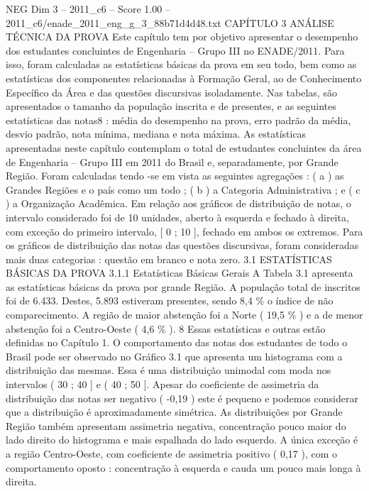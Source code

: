\begin{textsample}{NEG Dim 3 – 2011\_c6 – Score 1.00 – 2011\_c6/enade\_2011\_eng\_g\_3\_88b71d4d48.txt}  \label{ex:f3_neg_080}
CAPÍTULO 3 ANÁLISE TÉCNICA DA PROVA Este capítulo tem por objetivo apresentar o desempenho dos estudantes concluintes de Engenharia – Grupo III no ENADE/2011.
Para isso, foram calculadas as estatísticas básicas da prova em seu todo, bem como as estatísticas dos componentes relacionadas à Formação Geral, ao de Conhecimento Específico da Área e das questões discursivas isoladamente.
Nas tabelas, são apresentados o tamanho da população inscrita e de presentes, e as seguintes estatísticas das notas8 : média do desempenho na prova, erro padrão da média, desvio padrão, nota mínima, mediana e nota máxima.
As estatísticas apresentadas neste capítulo contemplam o total de estudantes concluintes da área de Engenharia – Grupo III em 2011 do Brasil e, separadamente, por Grande Região.
Foram calculadas tendo -se em vista as seguintes agregações : ( a ) as Grandes Regiões e o país como um todo ; ( b ) a Categoria Administrativa ; e ( c ) a Organização Acadêmica.
Em relação aos gráficos de distribuição de notas, o intervalo considerado foi de 10 unidades, aberto à esquerda e fechado à direita, com exceção do primeiro intervalo, [ 0 ; 10 ], fechado em ambos os extremos.
Para os gráficos de distribuição das notas das questões discursivas, foram consideradas mais duas categorias : questão em branco e nota zero. 3.1 ESTATÍSTICAS BÁSICAS DA PROVA 3.1.1 Estatísticas Básicas Gerais A Tabela 3.1 apresenta as estatísticas básicas da prova por grande Região.
A população total de inscritos foi de 6.433.
Destes, 5.893 estiveram presentes, sendo 8,4 \% o índice de não comparecimento.
A região de maior abstenção foi a Norte ( 19,5 \% ) e a de menor abstenção foi a Centro-Oeste ( 4,6 \% ). 8 Essas estatísticas e outras estão definidas no Capítulo 1.
O comportamento das notas dos estudantes de todo o Brasil pode ser observado no Gráfico 3.1 que apresenta um histograma com a distribuição das mesmas.
Essa é uma distribuição unimodal com moda nos intervalos ( 30 ; 40 ] e ( 40 ; 50 ].
Apesar do coeficiente de assimetria da distribuição das notas ser negativo ( -0,19 ) este é pequeno e podemos considerar que a distribuição é aproximadamente simétrica.
As distribuições por Grande Região também apresentam assimetria negativa, concentração pouco maior do lado direito do histograma e mais espalhada do lado esquerdo.
A única exceção é a região Centro-Oeste, com coeficiente de assimetria positivo ( 0,17 ), com o comportamento oposto : concentração à esquerda e cauda um pouco mais longa à direita.

\end{textsample}
